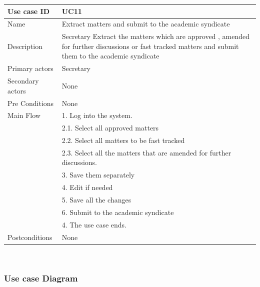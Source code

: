 \documentclass[a4paper,beamer]{article}
\begin{document}
			\begin{tabular}{|p{4cm}|p{8cm}|} \hline 
					\textbf{Use case ID} & \textbf{UC11}  \\ \hline
					Name & Extract matters and submit to the academic syndicate \\ \hline 
					Description & Secretary Extract the matters which are approved , amended for further discussions or fast tracked matters and submit them to the academic syndicate \\ \hline 
					Primary actors & Secretary \\ \hline 
					Secondary actors & None \\ \hline 
					Pre Conditions & None \\ \hline
					Main Flow & 1. Log into the system.\\
							& 2.1. Select all approved matters\\
							& 2.2. Select all matters to be fast tracked\\
							& 2.3. Select all the matters that are amended for further discussions. \\
							& 3. Save them separately\\
							& 4. Edit if needed\\
							& 5. Save all the changes\\
							& 6. Submit to the academic syndicate\\
							& 4. The use case ends.\\ \hline
					Postconditions & None \\ \hline 
			\end{tabular} \\[.6cm]
		
	\egroup
	\newpage      
	
	\subsubsection{Use case Diagram}
	
\end{document}
